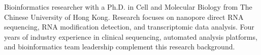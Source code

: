 \begin{cvparagraph}
Bioinformatics researcher with a Ph.D. in Cell and Molecular Biology from The Chinese University of Hong Kong. Research focuses on nanopore direct RNA sequencing, RNA modification detection, and transcriptomic data analysis. Four years of industry experience in clinical sequencing, automated analysis platforms, and bioinformatics team leadership complement this research background.
\end{cvparagraph}

